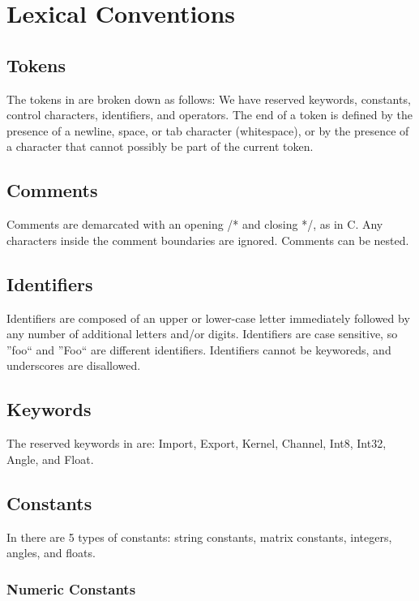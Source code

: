 \section{Lexical Conventions}
\label{sec:lex}

\subsection{Tokens}
\label{ssec:tokens}
The tokens in \sys{} are broken down as follows: We have reserved
keywords, constants, control characters, identifiers, and operators.
The end of a token is defined by the presence of a newline, space,
or tab character (whitespace), or by the presence of a character that
cannot possibly be part of the current token.

\subsection{Comments}
\label{ssec:comments}
Comments are demarcated with an opening /* and closing */, as in C.
Any characters inside the comment boundaries are ignored. Comments
can be nested.

\subsection{Identifiers}
\label{ssec:identifiers}
Identifiers are composed of an upper or lower-case letter immediately
followed by any number of additional letters and/or digits. Identifiers
are case sensitive, so ''foo`` and ''Foo`` are different identifiers.
Identifiers cannot be keyworeds, and underscores are disallowed.

\subsection{Keywords}
\label{ssec:keywords}
The reserved keywords in \sys{} are:
Import, Export, Kernel, Channel, 
Int8, Int32, Angle, and Float.


\subsection{Constants}
\label{ssec:constants}
In \sys{} there are 5 types of constants: string constants, matrix
constants, integers, angles, and floats.

\subsubsection{Numeric Constants}
\label{sssec:numericconstants}

